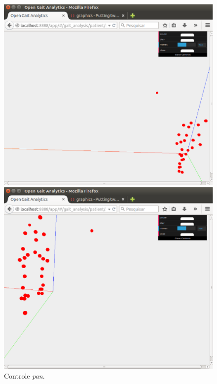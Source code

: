 \begin{figure}[ht]
  \centering
  \begin{minipage}[b]{0.49\textwidth}
    \includegraphics[width=\textwidth]{figuras/tela15.eps}
  \end{minipage}
  \hfill
  \begin{minipage}[b]{0.49\textwidth}
    \includegraphics[width=\textwidth]{figuras/tela16.eps}
  \end{minipage}
  \caption{Controle \emph{pan}.}
  \label{animacao4}
\end{figure}

